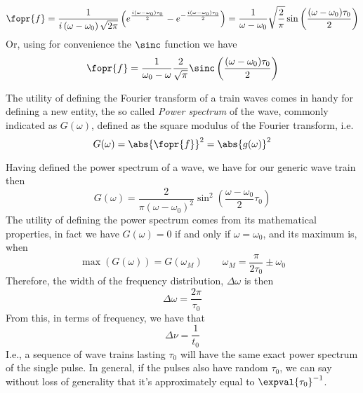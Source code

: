 \documentclass[../electromagnetism.tex]{subfiles}
\begin{document}
\begin{equation}
	\fopr{f}=\frac{1}{i\left( \omega-\omega_0 \right)\sqrt{2\pi}}\left( e^{\frac{i(\omega-\omega_0)\tau_0}{2}}-e^{-\frac{i(\omega-\omega_0)\tau_0}{2}} \right)=\frac{1}{\omega-\omega_0}\sqrt{\frac{2}{\pi}}\sin\left( \frac{(\omega-\omega_0)\tau_0}{2} \right)
	\label{eq:foprwavetrain}
\end{equation}
Or, using for convenience the $\sinc$ function we have
\begin{equation*}
	\fopr{f}=\frac{1}{\omega_0-\omega}\frac{2}{\sqrt{\pi}}\sinc\left( \frac{(\omega-\omega_0)\tau_0}{2} \right)
\end{equation*}
\begin{dfn}
	The utility of defining the Fourier transform of a train waves comes in handy for defining a new entity, the so called \emph{Power spectrum} of the wave, commonly indicated as $G(\omega)$, defined as the square modulus of the Fourier transform, i.e.
	\begin{equation}
		G(\omega)=\abs{\fopr{f}}^2=\abs{g(\omega)}^2
		\label{eq:powerspectrum}
	\end{equation}
\end{dfn}
Having defined the power spectrum of a wave, we have for our generic wave train then
\begin{equation}
	G(\omega)=\frac{2}{\pi(\omega-\omega_0)^2}\sin^2\left( \frac{\omega-\omega_0}{2}\tau_0 \right)
	\label{eq:powerspectrumwwavetrain}
\end{equation}
The utility of defining the power spectrum comes from its mathematical properties, in fact we have $G(\omega)=0$ if and only if $\omega=\omega_0$, and its maximum is, when
\begin{equation}
	\max\left( G(\omega) \right)=G\left( \omega_M \right)\qquad\omega_M=\frac{\pi}{2\tau_0}\pm\omega_0
	\label{eq:maximum}
\end{equation}
Therefore, the width of the frequency distribution, $\Delta\omega$ is then
\begin{equation}
	\Delta\omega=\frac{2\pi}{\tau_0}
	\label{eq:frequencywidthwavetrain}
\end{equation}
From this, in terms of frequency, we have that 
\begin{equation*}
	\Delta\nu=\frac{1}{t_0}
\end{equation*}
I.e., a sequence of wave trains lasting $\tau_0$ will have the same exact power spectrum of the single pulse. In general, if the pulses also have random $\tau_0$, we can say without loss of generality that it's approximately equal to $\expval{\tau_0}^{-1}$.\\
\end{document}
